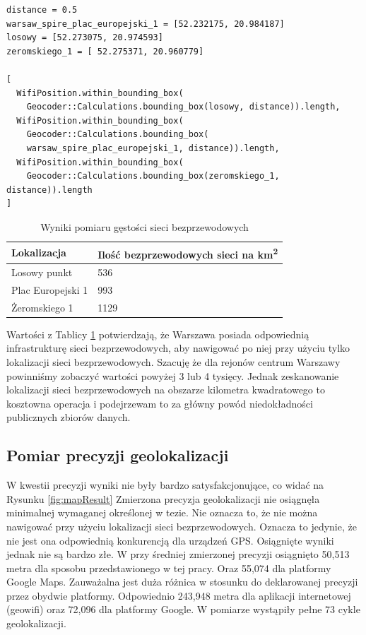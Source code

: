 \begin{verbatim}
distance = 0.5
warsaw_spire_plac_europejski_1 = [52.232175, 20.984187]
losowy = [52.273075, 20.974593]
zeromskiego_1 = [ 52.275371, 20.960779]

[
  WifiPosition.within_bounding_box(
    Geocoder::Calculations.bounding_box(losowy, distance)).length,
  WifiPosition.within_bounding_box(
    Geocoder::Calculations.bounding_box(
    warsaw_spire_plac_europejski_1, distance)).length,
  WifiPosition.within_bounding_box(
    Geocoder::Calculations.bounding_box(zeromskiego_1, distance)).length
]
\end{verbatim}

\begin{table}[h]
\caption{Wyniki pomiaru gęstości sieci bezprzewodowych}
\label{table:densityResult}
\begin{tabular} { |l|l|  }
\hline
Lokalizacja & Ilość bezprzewodowych sieci na km\textsuperscript{2} \\
\hline
\hline
Losowy punkt & 536 \\
Plac Europejski 1 & 993 \\
Żeromskiego 1 & 1129 \\
\hline
\end{tabular}
\end{table}

Wartości z Tablicy \ref{table:densityResult} potwierdzają, że Warszawa posiada odpowiednią infrastrukturę sieci bezprzewodowych, aby nawigować po niej przy użyciu tylko lokalizacji sieci bezprzewodowych. Szacuję że dla rejonów centrum Warszawy powinniśmy zobaczyć wartości powyżej 3 lub 4 tysięcy. Jednak zeskanowanie lokalizacji sieci bezprzewodowych na obszarze kilometra kwadratowego to kosztowna operacja i podejrzewam to za główny powód niedokładności publicznych zbiorów danych.

\subsection{Pomiar precyzji geolokalizacji}
W kwestii precyzji wyniki nie były bardzo satysfakcjonujące, co widać na Rysunku \ref{fig:mapResult} Zmierzona precyzja geolokalizacji nie osiągnęła minimalnej wymaganej określonej w tezie. Nie oznacza to, że nie można nawigować przy użyciu lokalizacji sieci bezprzewodowych. Oznacza to jedynie, że nie jest ona odpowiednią konkurencją dla urządzeń GPS. Osiągnięte wyniki jednak nie są bardzo złe. W przy średniej zmierzonej precyzji osiągnięto 50,513 metra dla sposobu przedstawionego w tej pracy. Oraz 55,074 dla platformy Google Maps. Zauważalna jest duża różnica w stosunku do deklarowanej precyzji przez obydwie platformy. Odpowiednio 243,948 metra dla aplikacji internetowej (geowifi) oraz 72,096 dla platformy Google. W pomiarze wystąpiły pełne 73 cykle geolokalizacji.

